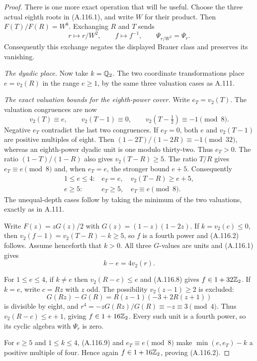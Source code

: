 \begin{proof}
There is one more exact operation that will be useful.
Choose the three actual eighth roots in (A.116.1), and
write $W$ for their product.
Then $F(T)/F(R)=W^8$.
Exchanging $R$ and $T$ sends
\[
             r\longmapsto r/W^2,\qquad
             f\longmapsto f^{-1},\qquad
             \Psi_{r/W^2}=\Psi_r.
\tag{A.116.6a}
\]
Consequently this exchange negates the displayed Brauer
class and preserves its vanishing.

\emph{The dyadic place.}
Now take $k=\mathbb Q_2$.
The two coordinate transformations place $e=v_2(R)$ in the range
$e\ge1$, by the same three valuation cases as A.111.

\emph{The exact valuation bounds for the eighth-power cover.}
Write $e_T=v_2(T)$.
The valuation congruences are now
\[
 v_2(T)\equiv e,\qquad v_2(T-1)\equiv0,\qquad
                  v_2(T-\tfrac12)\equiv-1\pmod8.
\tag{A.116.7}
\]
Negative $e_T$ contradict the last two congruences.
If $e_T=0$, both $e$ and $v_2(T-1)$ are positive
multiples of eight.
Then $(1-2T)/(1-2R)\equiv-1\pmod{32}$, whereas
an eighth-power dyadic unit is one modulo thirty-two.
Thus $e_T>0$.
The ratio $(1-T)/(1-R)$ also gives
$v_2(T-R)\ge5$.
The ratio $T/R$ gives $e_T\equiv e\pmod8$ and,
when $e_T=e$, the stronger bound $e+5$.
Consequently
\[
 \begin{array}{ll}
 1\le e\le4:&e_T=e,\quad v_2(T-R)\ge e+5,\\
 e\ge5:&e_T\ge5,\quad e_T\equiv e\pmod8.
 \end{array}
\tag{A.116.8}
\]
The unequal-depth cases follow by taking the
minimum of the two valuations, exactly as in A.111.

Write $F(z)=zG(z)/2$ with
$G(z)=(1-z)(1-2z)$.
If $k=v_2(c)\le0$, then
$v_2(f-1)=v_2(T-R)-k\ge5$, so $f$ is a fourth
power and (A.116.2) follows.
Assume henceforth that $k>0$.
All three $G$-values are units and (A.116.1) gives
\[
                         k-e=4v_2(r).
\tag{A.116.9}
\]

For $1\le e\le4$, if $k\ne e$ then
$v_2(R-c)\le e$ and (A.116.8) gives $f\in1+32\mathbb Z_2$.
If $k=e$, write $c=Rz$ with $z$ odd.
The possibility $v_2(z-1)\ge2$ is excluded:
\[
 G(Rz)-G(R)=R(z-1)(-3+2R(z+1))
\tag{A.116.10}
\]
is divisible by eight, and
$r^4=-zG(Rz)/G(R)\equiv-z\equiv3\pmod4$.
Thus $v_2(R-c)\le e+1$, giving $f\in1+16\mathbb Z_2$.
Every such unit is a fourth power, so its
cyclic algebra with $\Psi_r$ is zero.

For $e\ge5$ and $1\le k\le4$, (A.116.9) and
$e_T\equiv e\pmod8$ make
$\min(e,e_T)-k$ a positive multiple of four.
Hence again $f\in1+16\mathbb Z_2$, proving (A.116.2).


\end{proof}

